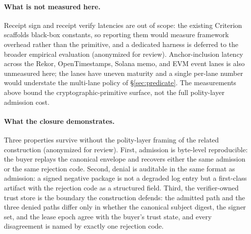 \paragraph{What is not measured here.} Receipt sign and receipt verify latencies are out of scope: the existing Criterion scaffolds black-box constants, so reporting them would measure framework overhead rather than the primitive, and a dedicated harness is deferred to the broader empirical evaluation (anonymized for review). Anchor-inclusion latency across the Rekor, OpenTimestamps, Solana memo, and EVM event lanes is also unmeasured here; the lanes have uneven maturity and a single per-lane number would understate the multi-lane policy of \S\ref{sec:predicate}. The measurements above bound the cryptographic-primitive surface, not the full polity-layer admission cost.

\paragraph{What the closure demonstrates.} Three properties survive without the polity-layer framing of the related construction (anonymized for review). First, admission is byte-level reproducible: the buyer replays the canonical envelope and recovers either the same admission or the same rejection code. Second, denial is auditable in the same format as admission: a signed negative package is not a degraded log entry but a first-class artifact with the rejection code as a structured field. Third, the verifier-owned trust store is the boundary the construction defends: the admitted path and the three denied paths differ only in whether the canonical subject digest, the signer set, and the lease epoch agree with the buyer's trust state, and every disagreement is named by exactly one rejection code.
